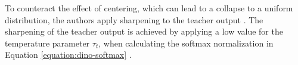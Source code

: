 To counteract the effect of centering, which can lead to a collapse to a uniform distribution, the authors apply sharpening to the teacher output \citep{Caron2021}.
The sharpening of the teacher output is achieved by applying a low value for the temperature parameter $\tau_t$, when calculating the softmax normalization in Equation \ref{equation:dino-softmax} \citep{Caron2021}.
